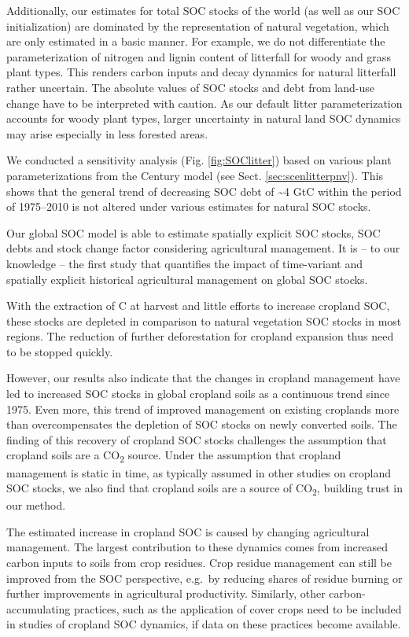 \documentclass[gc, manuscript]{copernicus}
\begin{document}
Additionally, our estimates for total SOC stocks of the world (as well as our SOC initialization) are dominated by the representation of natural vegetation, which are only estimated in a basic manner. For example, we do not differentiate the parameterization of nitrogen and lignin content of litterfall for woody and grass plant types. This renders carbon inputs and decay dynamics for natural litterfall rather uncertain. The absolute values of SOC stocks and debt from land-use change have to be interpreted with caution. As our default litter parameterization accounts for woody plant types, larger uncertainty in natural land SOC dynamics may arise especially in less forested areas.

We conducted a sensitivity analysis (Fig. \ref{fig:SOClitter}) based on various plant parameterizations from the Century model (see Sect. \ref{sec:scenlitterpnv}). This shows that the general trend of decreasing SOC debt of \textasciitilde4 GtC within the period of 1975--2010 is not altered under various estimates for natural SOC stocks.
\newpage

\conclusions

Our global SOC model is able to estimate spatially explicit SOC stocks, SOC debts and stock change factor considering agricultural management. It is -- to our knowledge -- the first study that quantifies the impact of time-variant and spatially explicit historical agricultural management on global SOC stocks.

With the extraction of C at harvest and little efforts to increase cropland SOC, these stocks are depleted in comparison to natural vegetation SOC stocks in most regions. The reduction of further deforestation for cropland expansion thus need to be stopped quickly.

However, our results also indicate that the changes in cropland management have led to increased SOC stocks in global cropland soils as a continuous trend since 1975. Even more, this trend of improved management on existing croplands more than overcompensates the depletion of SOC stocks on newly converted soils. The finding of this recovery of cropland SOC stocks challenges the assumption that cropland soils are a CO\textsubscript{2} source. Under the assumption that cropland management is static in time, as typically assumed in other studies on cropland SOC stocks, we also find that cropland soils are a source of CO\textsubscript{2}, building trust in our method.

The estimated increase in cropland SOC is caused by changing agricultural management. The largest contribution to these dynamics comes from increased carbon inputs to soils from crop residues. Crop residue management can still be improved from the SOC perspective, e.g.~by reducing shares of residue burning or further improvements in agricultural productivity. Similarly, other carbon-accumulating practices, such as the application of cover crops need to be included in studies of cropland SOC dynamics, if data on these practices become available.
\end{document}
